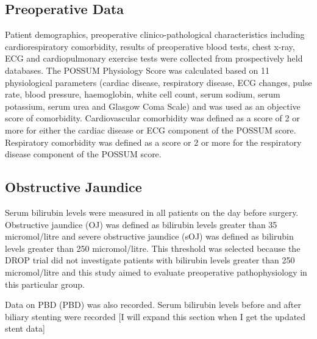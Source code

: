 \subsection{Preoperative Data}
Patient demographics, preoperative clinico-pathological characteristics including cardiorespiratory comorbidity, results of preoperative blood tests, chest x-ray, ECG and cardiopulmonary exercise tests were collected from prospectively held databases. The POSSUM Physiology Score was calculated based on 11 physiological parameters (cardiac disease, respiratory disease, ECG changes, pulse rate, blood pressure, haemoglobin, white cell count, serum sodium, serum potassium, serum urea and Glasgow Coma Scale) and was used as an objective score of comorbidity. Cardiovascular comorbidity was defined as a score of 2 or more for either the cardiac disease or ECG component of the POSSUM score. Respiratory comorbidity was defined as a score or 2 or more for the respiratory disease component of the POSSUM score. 

\subsection{Obstructive Jaundice}
Serum bilirubin levels were measured in all patients on the day before surgery. Obstructive jaundice (OJ) was defined as bilirubin levels greater than 35 micromol/litre and severe obstructive jaundice (sOJ) was defined as bilirubin levels greater than 250 micromol/litre. This threshold was selected because the DROP trial did not investigate patients with bilirubin levels greater than 250 micromol/litre and this study aimed to evaluate preoperative pathophysiology in this particular group. 

Data on PBD (PBD) was also recorded. Serum bilirubin levels before and after biliary stenting were recorded [I will expand this section when I get the updated stent data]

